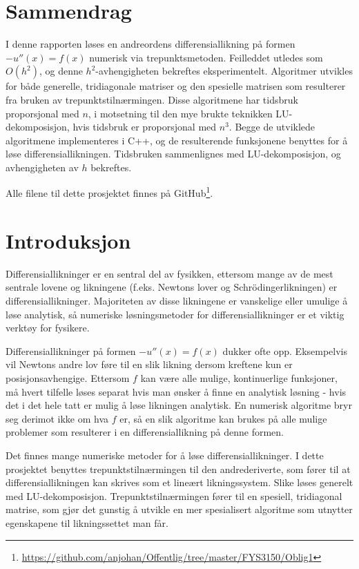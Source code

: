 \documentclass[12pt,norsk,a4paper]{report}
\begin{document}

\pagestyle{fancy}
\tableofcontents

\section{Sammendrag}
I denne rapporten løses en andreordens differensiallikning på formen \(-u''(x)=f(x)\) numerisk via trepunktsmetoden. Feilleddet utledes som \(O(h^2)\), og denne \(h^2\)-avhengigheten bekreftes eksperimentelt. Algoritmer utvikles for både generelle, tridiagonale matriser og den spesielle matrisen som resulterer fra bruken av trepunktstilnærmingen. Disse algoritmene har tidsbruk proporsjonal med \(n\), i motsetning til den mye brukte teknikken LU-dekomposisjon, hvis tidsbruk er proporsjonal med \(n^3\). Begge de utviklede algoritmene implementeres i C++, og de resulterende funksjonene benyttes for å løse differensiallikningen. Tidsbruken sammenlignes med LU-dekomposisjon, og avhengigheten av \(h\) bekreftes.

Alle filene til dette prosjektet finnes på GitHub\footnote{\url{https://github.com/anjohan/Offentlig/tree/master/FYS3150/Oblig1}}.


\section{Introduksjon}
Differensiallikninger er en sentral del av fysikken, ettersom mange av de mest sentrale lovene og likningene (f.eks. Newtons lover og Schrödingerlikningen) er differensiallikninger. Majoriteten av disse likningene er vanskelige eller umulige å løse analytisk, så numeriske løsningsmetoder for differensiallikninger er et viktig verktøy for fysikere.

Differensiallikninger på formen \(-u''(x)=f(x)\) dukker ofte opp. Eksempelvis vil Newtons andre lov føre til en slik likning dersom kreftene kun er posisjonsavhengige. Ettersom \(f\) kan være alle mulige, kontinuerlige funksjoner, må hvert tilfelle løses separat hvis man ønsker å finne en analytisk løsning - hvis det i det hele tatt er mulig å løse likningen analytisk. En numerisk algoritme bryr seg derimot ikke om hva \(f\) er, så en slik algoritme kan brukes på alle mulige problemer som resulterer i en differensiallikning på denne formen.

Det finnes mange numeriske metoder for å løse differensiallikninger. I dette prosjektet benyttes trepunktstilnærmingen til den andrederiverte, som fører til at differensiallikningen kan skrives som et lineært likningssystem. Slike løses generelt med LU-dekomposisjon. Trepunktstilnærmingen fører til en spesiell, tridiagonal matrise, som gjør det gunstig å utvikle en mer spesialisert algoritme som utnytter egenskapene til likningssettet man får.
\end{document}
